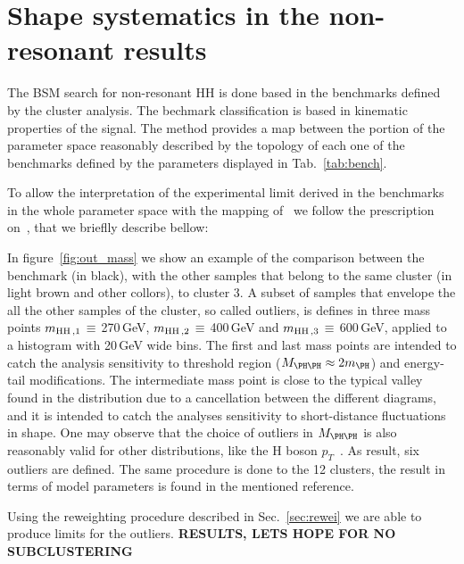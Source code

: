 \section{Shape systematics in the non-resonant results}
\label{sec:shapesyst}

The BSM search for non-resonant HH is done based in the benchmarks defined by the cluster analysis. 
The bechmark classification is based in kinematic properties of the signal. The method 
provides a map between the portion of the parameter space reasonably described by the 
topology of each one of the benchmarks defined by the parameters displayed in Tab.~\ref{tab:bench}. 

To allow the interpretation of the experimental limit derived in the benchmarks 
in the whole parameter space with the mapping of~\cite{Dall'Osso:2015aia} we follow 
the prescription on~\cite{CarvalhoAntunesDeOliveira:2130724}, that we brieflly 
describe bellow:

In figure~\ref{fig:out_mass} we show an example of the comparison between the benchmark (in black), 
with the other samples that belong to the same cluster (in light brown and other collors), to cluster 3.
A subset of samples that envelope the all the other samples of the cluster, so called outliers, is defines in three mass points  $m_{\rm HH\,,1}\,\equiv$ 270\,GeV, $m_{\rm HH\,,2}\,\equiv$ 400\,GeV and $m_{\rm HH\,,3}\,\equiv$ 600\,GeV, applied to a histogram with 20\,GeV wide bins. The first and last mass points are intended to catch
the analysis sensitivity to threshold region ($\mHH \approx 2 m_{\PH}$) and energy-tail modifications. The
intermediate mass point is close to the typical valley found
in the distribution due to a cancellation between the different diagrams, and it is intended
to catch the analyses sensitivity to short-distance fluctuations in shape. 
One may observe that the choice of outliers in $\mHH$ is also reasonably valid for other distributions, like the 
H boson $p_T$~\cite{CarvalhoAntunesDeOliveira:2130724}. 
As result, six outliers are defined. The same procedure is done to the 12 clusters, the result in terms of model parameters 
is found in the mentioned reference. 

Using the reweighting procedure described in Sec.~\ref{sec:rewei} we are able to produce limits for the 
outliers. {\bf 	RESULTS, LETS HOPE FOR NO SUBCLUSTERING}

